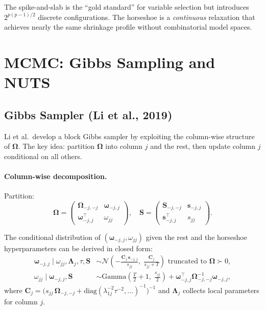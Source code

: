\documentclass[11pt,a4paper]{article}
\newcommand{\Normal}{\mathcal{N}}
\newcommand{\bOmega}{\bm{\Omega}}
\begin{document}
The spike-and-slab is the ``gold standard'' for variable selection but introduces $2^{p(p-1)/2}$ discrete configurations. The horseshoe is a \emph{continuous} relaxation that achieves nearly the same shrinkage profile without combinatorial model spaces.


\section{MCMC: Gibbs Sampling and NUTS}\label{sec:mcmc}

\subsection{Gibbs Sampler (Li et al., 2019)}

Li et al.\ develop a block Gibbs sampler by exploiting the column-wise structure of $\bOmega$. The key idea: partition $\bOmega$ into column $j$ and the rest, then update column $j$ conditional on all others.

\paragraph{Column-wise decomposition.} Partition:
\begin{equation}
  \bOmega = \begin{pmatrix} \bOmega_{-j,-j} & \bm{\omega}_{-j,j} \\ \bm{\omega}_{-j,j}^\top & \omega_{jj} \end{pmatrix}, \quad
  \bm{S} = \begin{pmatrix} \bm{S}_{-j,-j} & \bm{s}_{-j,j} \\ \bm{s}_{-j,j}^\top & s_{jj} \end{pmatrix}.
\end{equation}

The conditional distribution of $(\bm{\omega}_{-j,j}, \omega_{jj})$ given the rest and the horseshoe hyperparameters can be derived in closed form:
\begin{align}
  \bm{\omega}_{-j,j} \mid \omega_{jj}, \bm{\Lambda}_j, \tau, \bm{S}
  &\sim \Normal\!\left(-\frac{\bm{C}_j\,\bm{s}_{-j,j}}{s_{jj}},\;\frac{\bm{C}_j}{s_{jj} + T}\right) \text{ truncated to } \bOmega \succ 0,\\
  \omega_{jj} \mid \bm{\omega}_{-j,j}, \bm{S}
  &\sim \text{Gamma}\!\left(\frac{T}{2}+1,\;\frac{s_{jj}}{2}\right) + \bm{\omega}_{-j,j}^\top\bOmega_{-j,-j}^{-1}\bm{\omega}_{-j,j},
\end{align}
where $\bm{C}_j = \big(s_{jj}\,\bOmega_{-j,-j} + \text{diag}(\lambda_{1j}^{-2}\tau^{-2},\ldots)^{-1}\big)^{-1}$ and $\bm{\Lambda}_j$ collects local parameters for column $j$.
\end{document}
